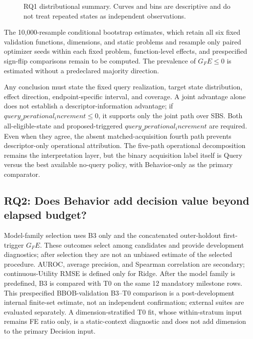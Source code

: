 \begin{figure}[t]
  \centering
  \caption{RQ1 distributional summary.  Curves and bins are descriptive and do
  not treat repeated states as independent observations.}
  \label{fig:rq1-utility}
\end{figure}

 The 10,000-resample conditional bootstrap estimates,
which retain all six fixed validation functions, dimensions, and static
problems and resample only paired optimizer seeds within each fixed problem,
function-level effects, and
prespecified sign-flip comparisons remain to be computed.  The prevalence of
$G_FE\le0$ is estimated without a predeclared majority direction.

 Any conclusion must state the fixed query realization,
target state
distribution, effect direction, endpoint-specific interval, and coverage.  A
joint advantage alone does not establish a descriptor-information advantage;
if $query_operational_increment\le0$, it supports only the joint path over SBS.  Both all-eligible-state
and proposed-triggered $query_operational_increment$ are required.  Even when they agree, the absent matched-acquisition fourth path prevents descriptor-only operational attribution.  The five-path operational decomposition remains the interpretation layer, but the binary acquisition label itself is Query versus the best available no-query policy, with Behavior-only as the primary comparator.

\FloatBarrier

\subsection{RQ2: Does Behavior add decision value beyond elapsed budget?}

Model-family selection uses B3 only and the concatenated outer-holdout
first-trigger $G_FE$.  These outcomes select among candidates and provide
development diagnostics; after selection they are not an unbiased estimate of
the selected procedure.  AUROC, average precision, and Spearman correlation
are secondary; continuous-Utility RMSE is defined only for Ridge.  After the
model family is predefined, B3 is compared with T0 on the same 12 mandatory
milestone rows.  This prespecified BBOB-validation B3--T0 comparison is a
post-development internal finite-set estimate, not an independent confirmation;
external suites are evaluated separately.  A dimension-stratified T0 fit,
whose within-stratum input remains FE ratio only, is a static-context diagnostic
and does not add dimension to the primary Decision input.

